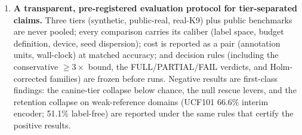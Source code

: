 \begin{enumerate}
The cost of freezing itself is likewise measured. A frozen-encoder control on the three real E9-series tiers (NTU120, UCF101, PanAf500) shows naive freezing retains only \textbf{88.9\%/66.6\%/85.8\%} of full-budget accuracy under the interim supervised encoder, and a protocol-return amendment executing the pre-registered label-free physics layer on NTU120, UCF101, and PanAf500 reads \textbf{75.0\%/51.1\%/82.5\%} (all \textbf{FAILS}; Section~\ref{ssec:boundary}).
\item \textbf{A transparent, pre-registered evaluation protocol for tier-separated claims.} Three tiers (synthetic, public-real, real-K9) plus public benchmarks are never pooled; every comparison carries its caliber (label space, budget definition, device, seed dispersion); cost is reported as a pair (annotation units, wall-clock) at matched accuracy; and decision rules (including the conservative $\geq 3\times$ bound, the FULL/PARTIAL/FAIL verdicts, and Holm-corrected families) are frozen before runs. Negative results are first-class findings: the canine-tier collapse below chance, the null rescue levers, and the retention collapse on weak-reference domains (UCF101 66.6\% interim encoder; 51.1\% label-free) are reported under the same rules that certify the positive results.

\end{enumerate}
